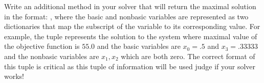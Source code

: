 \begin{problem}
Write an additional method in your solver that will return the maximal solution in the format: , where the basic and nonbasic variables are represented as two dictionaries that map the subscript of the variable to its corresponding value.
For example, the tuple  represents the solution to the system 
where maximal value of the objective function is $55.0$ and the 
basic variables are $x_0=.5$ and $x_3=.33333$ and the nonbasic variables are $x_1, x_2$ which are both zero.
The correct format of this tuple is critical as this tuple of information will be used judge if your solver works!
\end{problem}


% 
% 
% 
% 

